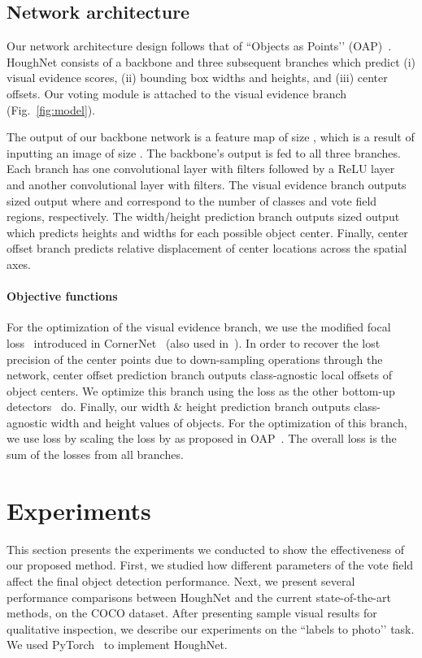 \documentclass[runningheads]{llncs}
\begin{document}
\subsection{Network architecture}
Our network architecture design follows that of ``Objects as Points’’ (OAP)~\cite{centernet}. HoughNet consists of a backbone and three subsequent branches which predict  (i) visual evidence scores, (ii) bounding box widths and heights, and (iii) center offsets. Our voting module is attached to the visual evidence branch (Fig.~\ref{fig:model}). 


The output of our backbone network is a feature map of size , which is a result of inputting an image of size . The backbone’s output is fed to all three branches. 
Each branch has one convolutional layer with   filters followed by a ReLU layer  and another convolutional layer with  filters. The visual evidence branch outputs  sized output where  and  correspond to the number of classes and vote field regions, respectively.
The width/height prediction branch outputs  sized output which predicts heights and widths for each possible object center.
Finally, center offset branch predicts relative displacement of center locations across the spatial axes. 
 
\paragraph{\textbf{Objective functions}} For the optimization of the visual evidence branch, we use the modified focal loss~\cite{retinanet} introduced in CornerNet~\cite{cornernet} (also used in~\cite{extremenet, centernet}).  In order to recover the lost precision of the center points due to down-sampling operations through the network, center offset prediction branch outputs class-agnostic local offsets of object centers. We optimize this branch using the   loss as the other bottom-up detectors~\cite{cornernet, extremenet, centernet} do. Finally, our width \& height prediction branch outputs class-agnostic width and height values of objects. For the optimization of this branch, we use   loss by scaling the loss by  as proposed in OAP~\cite{centernet}. The overall loss is the sum of the losses from all branches.


\section{Experiments}
\label{sec:exp}




This section presents the experiments we conducted to show the effectiveness of our proposed method. First, we studied how different parameters of the vote field affect the final object detection performance. Next, we present several performance comparisons between HoughNet and the current state-of-the-art methods, on the COCO dataset. After presenting sample visual results for qualitative inspection, we describe our experiments on the ``labels to photo’’ task. We used PyTorch~\cite{pytorch} to implement HoughNet. 
\end{document}
